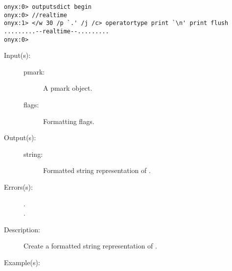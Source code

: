 \begin{description}
\begin{description}
\begin{verbatim}
onyx:0> outputsdict begin
onyx:0> //realtime
onyx:1> </w 30 /p `.' /j /c> operatortype print `\n' print flush
.........--realtime--.........
onyx:0>
		\end{verbatim}
	\end{description}
\label{outputsdict:pmarktype}
\item[{\onyxop{pmark flags}{pmarktype}{string}}: ]
	\begin{description}\item[]
	\item[Input(s): ]
		\begin{description}\item[]
		\item[pmark: ]
			A pmark object.
		\item[flags: ]
			Formatting flags.
		\end{description}
	\item[Output(s): ]
		\begin{description}\item[]
		\item[string: ]
			Formatted string representation of .
		\end{description}
	\item[Errors(s): ]
		\begin{description}\item[]
		\item[.]
		\item[.]
		\end{description}
	\item[Description: ]
		Create a formatted string representation of .
	\item[Example(s): ]\begin{verbatim}


\end{verbatim}
\end{description}
\end{description}
